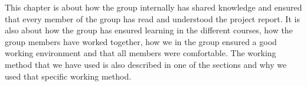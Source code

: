 This chapter is about how the group internally has shared knowledge and ensured that every member of the group has read and understood the project report. It is also about how the group has ensured learning in the different courses, how the group members have worked together, how we in the group ensured a good working environment and that all members were comfortable. The working method that we have used is also described in one of the sections and why we used that specific working method.